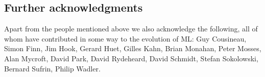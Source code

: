 \subsection*{Further acknowledgments}
Apart from the people mentioned above we also acknowledge the following,
all of whom have contributed in some way to the evolution of ML:
Guy Cousineau, Simon Finn, Jim Hook,
Gerard Huet, Gilles Kahn,
Brian Monahan, 
Peter Mosses, Alan Mycroft,  David Park,
David Rydeheard, 
David Schmidt,  Stefan Sokolowski, Bernard Sufrin,
Philip Wadler.

\newpage
\label{references-sec}
